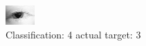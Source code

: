 \begin{figure}[h!]
\begin{center}
\includegraphics[width=0.60\columnwidth]{figures/ID130_class_4_target_3.png}
\end{center}
\caption{ Classification: 4 actual target: 3}
\label{fig:ID130_class_4_target_3}
\end{figure}
